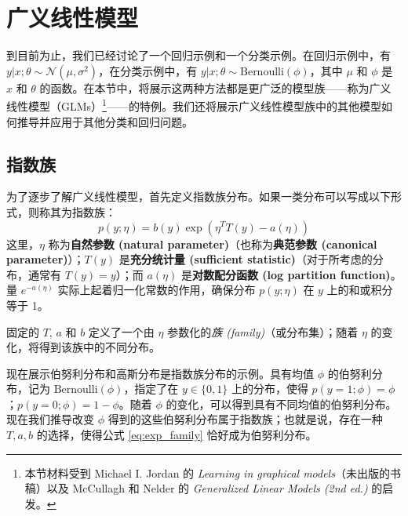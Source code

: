 \chapter{广义线性模型}
到目前为止，我们已经讨论了一个回归示例和一个分类示例。在回归示例中，有 $y|x; \theta \sim \mathcal{N}(\mu, \sigma^2)$，在分类示例中，有 $y|x; \theta \sim \text{Bernoulli}(\phi)$，其中 $\mu$ 和 $\phi$ 是 $x$ 和 $\theta$ 的函数。在本节中，将展示这两种方法都是更广泛的模型族——称为广义线性模型（GLMs）\footnote{本节材料受到 Michael I. Jordan 的 \textit{Learning in graphical models}（未出版的书稿）以及 McCullagh 和 Nelder 的 \textit{Generalized Linear Models (2nd ed.)} 的启发。}——的特例。我们还将展示广义线性模型族中的其他模型如何推导并应用于其他分类和回归问题。

\section{指数族}

为了逐步了解广义线性模型，首先定义指数族分布。如果一类分布可以写成以下形式，则称其为指数族：
\begin{equation}
    p(y; \eta) = b(y) \exp(\eta^T T(y) - a(\eta))
    \label{eq:exp_family}
\end{equation}
这里，$\eta$ 称为\textbf{自然参数 (natural parameter)}（也称为\textbf{典范参数 (canonical parameter)}）；$T(y)$ 是\textbf{充分统计量 (sufficient statistic)}（对于所考虑的分布，通常有 $T(y)=y$）；而 $a(\eta)$ 是\textbf{对数配分函数 (log partition function)}。量 $e^{-a(\eta)}$ 实际上起着归一化常数的作用，确保分布 $p(y; \eta)$ 在 $y$ 上的和或积分等于 1。

固定的 $T$, $a$ 和 $b$ 定义了一个由 $\eta$ 参数化的\textit{族 (family)}（或分布集）；随着 $\eta$ 的变化，将得到该族中的不同分布。

现在展示伯努利分布和高斯分布是指数族分布的示例。具有均值 $\phi$ 的伯努利分布，记为 $\text{Bernoulli}(\phi)$，指定了在 $y \in \{0, 1\}$ 上的分布，使得 $p(y=1; \phi) = \phi$；$p(y=0; \phi) = 1-\phi$。随着 $\phi$ 的变化，可以得到具有不同均值的伯努利分布。现在我们推导改变 $\phi$ 得到的这些伯努利分布属于指数族；也就是说，存在一种 $T, a, b$ 的选择，使得公式 \eqref{eq:exp_family} 恰好成为伯努利分布。

